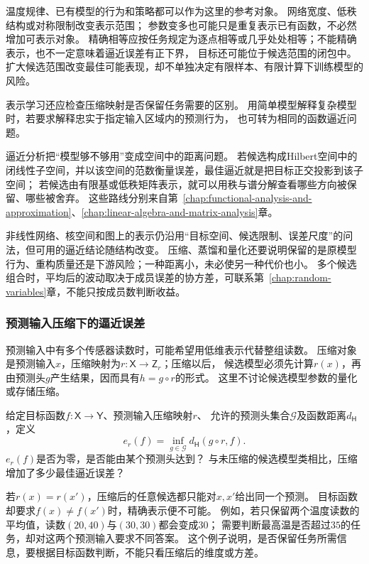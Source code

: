 温度规律、已有模型的行为和策略都可以作为这里的参考对象。
网络宽度、低秩结构或对称限制改变表示范围；
参数变多也可能只是重复表示已有函数，不必然增加可表示对象。
精确相等应按任务规定为逐点相等或几乎处处相等；不能精确表示，也不一定意味着逼近误差有正下界，
目标还可能位于候选范围的闭包中。扩大候选范围改变最佳可能表现，却不单独决定有限样本、有限计算下训练模型的风险。

表示学习还应检查压缩映射是否保留任务需要的区别。
用简单模型解释复杂模型时，若要求解释忠实于指定输入区域内的预测行为，
也可转为相同的函数逼近问题。

逼近分析把“模型够不够用”变成空间中的距离问题。
若候选构成Hilbert空间中的闭线性子空间，并以该空间的范数衡量误差，最佳逼近就是把目标正交投影到该子空间；
若候选由有限基或低秩矩阵表示，就可以用秩与谱分解查看哪些方向被保留、哪些被舍弃。
这些路线分别来自第~\ref{chap:functional-analysis-and-approximation}、\ref{chap:linear-algebra-and-matrix-analysis}章。

非线性网络、核空间和图上的表示仍沿用“目标空间、候选限制、误差尺度”的问法，但可用的逼近结论随结构改变。
压缩、蒸馏和量化还要说明保留的是原模型行为、重构质量还是下游风险；一种距离小，未必使另一种代价也小。
多个候选组合时，平均后的波动取决于成员误差的协方差，可联系第~\ref{chap:random-variables}章，不能只按成员数判断收益。

\subsubsection{预测输入压缩下的逼近误差}
\label{sec:future-analysis-input-compression}

预测输入中有多个传感器读数时，可能希望用低维表示代替整组读数。
压缩对象是预测输入$x$，压缩映射为$r:\mathsf X\to\mathsf Z_r$；压缩以后，
候选模型必须先计算$r(x)$，再由预测头$g$产生结果，因而具有$h=g\circ r$的形式。
这里不讨论候选模型参数的量化或存储压缩。

\begin{mathproblem}[预测输入压缩造成的最佳逼近误差]
  \label{question:future-input-compression}
  给定目标函数$f:\mathsf X\to\mathsf Y$、预测输入压缩映射$r$、
  允许的预测头集合$\mathcal G$及函数距离$d_{\mathsf H}$，定义
  \[
    e_r(f)=\inf_{g\in\mathcal G}d_{\mathsf H}(g\circ r,f).
  \]
  $e_r(f)$是否为零，是否能由某个预测头达到？
  与未压缩的候选模型类相比，压缩增加了多少最佳逼近误差？
\end{mathproblem}

若$r(x)=r(x')$，压缩后的任意候选都只能对$x,x'$给出同一个预测。
目标函数却要求$f(x)\ne f(x')$时，精确表示便不可能。
例如，若只保留两个温度读数的平均值，读数$(20,40)$与$(30,30)$都会变成$30$；
需要判断最高温是否超过$35$的任务，却对这两个预测输入要求不同答案。
这个例子说明，是否保留任务所需信息，要根据目标函数判断，不能只看压缩后的维度或方差。

